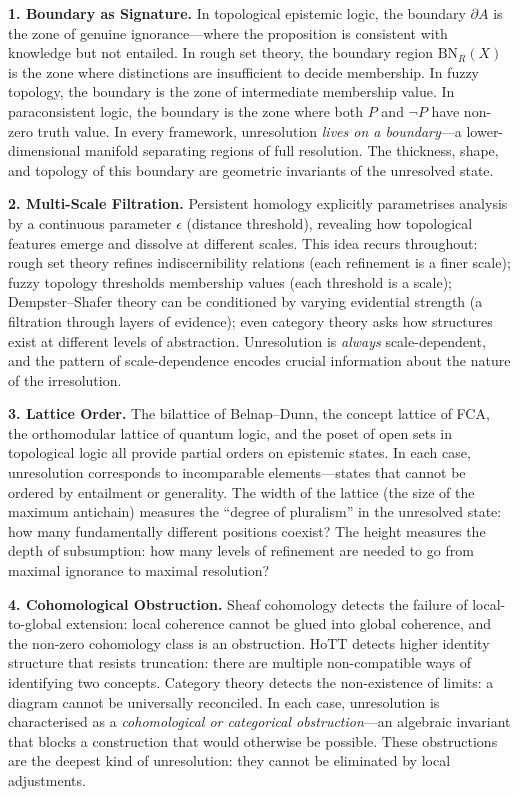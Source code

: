 \documentclass[11pt,letterpaper]{article}
\theoremstyle{definition}
\theoremstyle{remark}
\begin{document}
\textbf{1. Boundary as Signature.} In topological epistemic logic, the boundary $\partial A$ is the zone of genuine ignorance---where the proposition is consistent with knowledge but not entailed. In rough set theory, the boundary region $\mathrm{BN}_R(X)$ is the zone where distinctions are insufficient to decide membership. In fuzzy topology, the boundary is the zone of intermediate membership value. In paraconsistent logic, the boundary is the zone where both $P$ and $\neg P$ have non-zero truth value. In every framework, unresolution \emph{lives on a boundary}---a lower-dimensional manifold separating regions of full resolution. The thickness, shape, and topology of this boundary are geometric invariants of the unresolved state.

\textbf{2. Multi-Scale Filtration.} Persistent homology explicitly parametrises analysis by a continuous parameter $\epsilon$ (distance threshold), revealing how topological features emerge and dissolve at different scales. This idea recurs throughout: rough set theory refines indiscernibility relations (each refinement is a finer scale); fuzzy topology thresholds membership values (each threshold is a scale); Dempster--Shafer theory can be conditioned by varying evidential strength (a filtration through layers of evidence); even category theory asks how structures exist at different levels of abstraction. Unresolution is \emph{always} scale-dependent, and the pattern of scale-dependence encodes crucial information about the nature of the irresolution.

\textbf{3. Lattice Order.} The bilattice of Belnap--Dunn, the concept lattice of FCA, the orthomodular lattice of quantum logic, and the poset of open sets in topological logic all provide partial orders on epistemic states. In each case, unresolution corresponds to incomparable elements---states that cannot be ordered by entailment or generality. The width of the lattice (the size of the maximum antichain) measures the ``degree of pluralism'' in the unresolved state: how many fundamentally different positions coexist? The height measures the depth of subsumption: how many levels of refinement are needed to go from maximal ignorance to maximal resolution?

\textbf{4. Cohomological Obstruction.} Sheaf cohomology detects the failure of local-to-global extension: local coherence cannot be glued into global coherence, and the non-zero cohomology class is an obstruction. HoTT detects higher identity structure that resists truncation: there are multiple non-compatible ways of identifying two concepts. Category theory detects the non-existence of limits: a diagram cannot be universally reconciled. In each case, unresolution is characterised as a \emph{cohomological or categorical obstruction}---an algebraic invariant that blocks a construction that would otherwise be possible. These obstructions are the deepest kind of unresolution: they cannot be eliminated by local adjustments.
\end{document}
